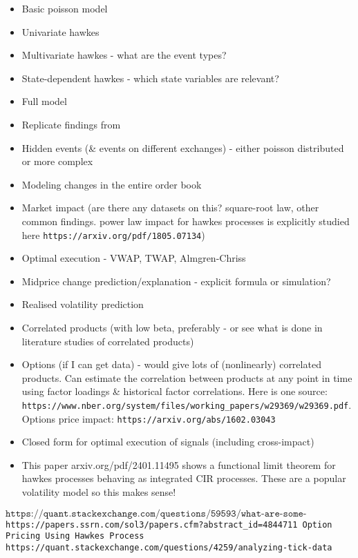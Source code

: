 \documentclass[honours,12pt]{unswthesis}
\numberwithin{equation}{section}
\begin{document}
\begin{itemize}
	\item Basic poisson model
	\item Univariate hawkes
	\item Multivariate hawkes - what are the event types?
	\item State-dependent hawkes - which state variables are relevant?
	\item Full model
	\item Replicate findings from \cite{MorariuPatrichiPakkanen}
	\item Hidden events (\& events on different exchanges) - either poisson distributed or more complex
	\item Modeling changes in the entire order book
	\item Market impact (are there any datasets on this? square-root law, other common findings. power law impact for hawkes processes is explicitly studied here \texttt{https://arxiv.org/pdf/1805.07134})
	\item Optimal execution - VWAP, TWAP, Almgren-Chriss
	\item Midprice change prediction/explanation - explicit formula or simulation?
	\item Realised volatility prediction
	\item Correlated products (with low beta, preferably - or see what is done in literature studies of correlated products)
	\item Options (if I can get data) - would give lots of (nonlinearly) correlated products. Can estimate the correlation between products at any point in time using factor loadings \& historical factor correlations. Here is one source: \texttt{https://www.nber.org/system/files/working_papers/w29369/w29369.pdf}. Options price impact: \texttt{https://arxiv.org/abs/1602.03043}
	\item Closed form for optimal execution of signals (including cross-impact)
	\item This paper arxiv.org/pdf/2401.11495 shows a functional limit theorem for hawkes processes behaving as integrated CIR processes. These are a popular volatility model so this makes sense!
\end{itemize}

$\texttt{https://quant.stackexchange.com/questions/59593/what-are-some-currently-open-problems-in-market-microstructure}$
\texttt{https://papers.ssrn.com/sol3/papers.cfm?abstract_id=4844711 Option Pricing Using Hawkes Process}
\texttt{https://quant.stackexchange.com/questions/4259/analyzing-tick-data}
\end{document}
